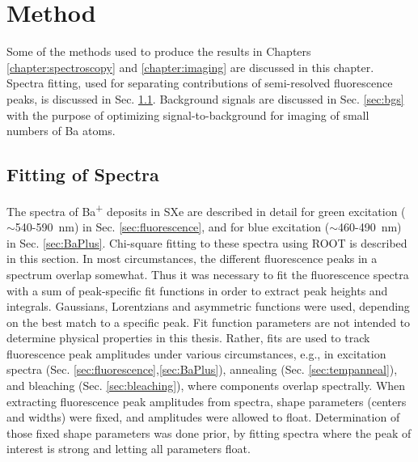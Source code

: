 \chapter{Method}

Some of the methods used to produce the results in Chapters \ref{chapter:spectroscopy} and \ref{chapter:imaging} are discussed in this chapter.  Spectra fitting, used for separating contributions of semi-resolved fluorescence peaks, is discussed in Sec. \ref{sec:fitting}.  Background signals are discussed in Sec. \ref{sec:bgs} with the purpose of optimizing signal-to-background for imaging of small numbers of Ba atoms.

\section{Fitting of Spectra}
\label{sec:fitting} %

The spectra of Ba\textsuperscript{+} deposits in SXe are described in detail for green excitation ($\sim$540-590~nm) in Sec. \ref{sec:fluorescence}, and for blue excitation ($\sim$460-490~nm) in Sec. \ref{sec:BaPlus}.  Chi-square fitting to these spectra using ROOT is described in this section.  In most circumstances, the different fluorescence peaks in a spectrum overlap somewhat.  Thus it was necessary to fit the fluorescence spectra with a sum of peak-specific fit functions in order to extract peak heights and integrals.  Gaussians, Lorentzians and asymmetric functions were used, depending on the best match to a specific peak.  Fit function parameters are not intended to determine physical properties in this thesis.  Rather, fits are used to track fluorescence peak amplitudes under various circumstances, e.g., in excitation spectra (Sec. \ref{sec:fluorescence},\ref{sec:BaPlus}), annealing (Sec. \ref{sec:tempanneal}), and bleaching (Sec. \ref{sec:bleaching}), where components overlap spectrally.  When extracting fluorescence peak amplitudes from spectra, shape parameters (centers and widths) were fixed, and amplitudes were allowed to float.  Determination of those fixed shape parameters was done prior, by fitting spectra where the peak of interest is strong and letting all parameters float.


